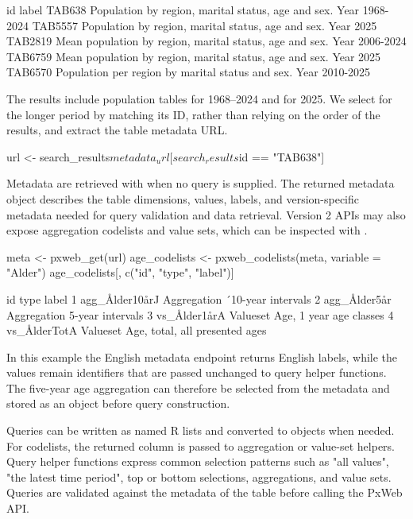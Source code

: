 \begin{example}
 id      label
 TAB638  Population by region, marital status, age and sex.  Year 1968-2024
 TAB5557 Population by region, marital status, age and sex. Year 2025
 TAB2819 Mean population by region, marital status, age and sex. Year 2006-2024
 TAB6759 Mean population by region, marital status, age and sex.  Year 2025
 TAB6570 Population per region by marital status and sex. Year 2010-2025
\end{example}

The results include population tables for 1968--2024 and for 2025.
We select  for the longer period by matching its ID, rather than relying on the order of the results, and extract the table metadata URL.

\begin{example}
url <- search_results$metadata_url[search_results$id == "TAB638"]
\end{example}

Metadata are retrieved with  when no query is supplied.
The returned metadata object describes the table dimensions, values, labels, and version-specific metadata needed for query validation and data retrieval.
Version 2 APIs may also expose aggregation codelists and value sets, which can be inspected with .

\begin{example}
meta <- pxweb_get(url)
age_codelists <- pxweb_codelists(meta, variable = "Alder")
age_codelists[, c("id", "type", "label")]
\end{example}

\begin{example}
              id        type                          label
1 agg_Ålder10årJ Aggregation             ´10-year intervals
2   agg_Ålder5år Aggregation               5-year intervals
3   vs_Ålder1årA    Valueset        Age, 1 year age classes
4   vs_ÅlderTotA    Valueset Age, total, all presented ages
\end{example}

In this example the English metadata endpoint returns English labels, while the  values remain identifiers that are passed unchanged to query helper functions.
The five-year age aggregation can therefore be selected from the metadata and stored as an object before query construction.

Queries can be written as named R lists and converted to  objects when needed.
For codelists, the returned  column is passed to aggregation or value-set helpers.
Query helper functions express common selection patterns such as "all values", "the latest time period", top or bottom selections, aggregations, and value sets.
Queries are validated against the metadata of the table before calling the PxWeb API.

